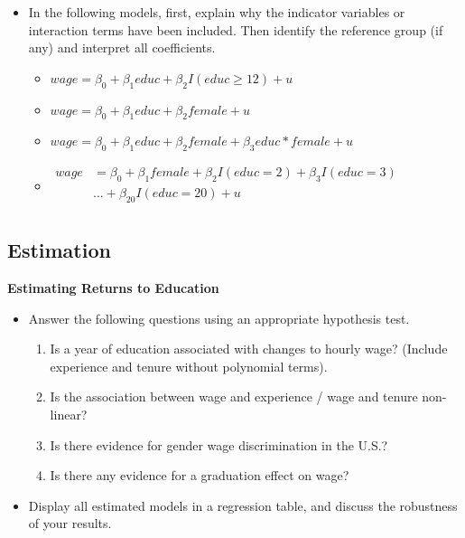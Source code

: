 \documentclass[
]{book}
\providecommand{\tightlist}{%
  \setlength{\itemsep}{0pt}\setlength{\parskip}{0pt}}
\theoremstyle{definition}
\theoremstyle{definition}
\theoremstyle{definition}
\theoremstyle{definition}
\theoremstyle{remark}
\begin{document}
\begin{itemize}
\item
  In the following models, first, explain why the indicator variables or interaction terms have been included. Then identify the reference group (if any) and interpret all coefficients.

  \begin{itemize}
  \item
    \(wage = \beta_0 + \beta_1 educ + \beta_2 I(educ \geq 12) + u\)
  \item
    \(wage = \beta_0 + \beta_1 educ + \beta_2 female + u\)
  \item
    \(wage = \beta_0 + \beta_1 educ + \beta_2 female + \beta_3 educ*female + u\)
  \item
    \(\begin{aligned} wage &= \beta_0 + \beta_1 female + \beta_2 I(educ = 2) + \beta_3 I(educ = 3)\\ &...+ \beta_{20} I(educ = 20) + u\\ \end{aligned}\)
  \end{itemize}
\end{itemize}

\hypertarget{estimation}{%
\subsection{Estimation}\label{estimation}}

\textbf{Estimating Returns to Education}

\begin{itemize}
\tightlist
\item
  Answer the following questions using an appropriate hypothesis test.

  \begin{enumerate}
  \def\labelenumi{\arabic{enumi}.}
  \tightlist
  \item
    Is a year of education associated with changes to hourly wage? (Include experience and tenure without polynomial terms).
  \item
    Is the association between wage and experience / wage and tenure non-linear?
  \item
    Is there evidence for gender wage discrimination in the U.S.?
  \item
    Is there any evidence for a graduation effect on wage?
  \end{enumerate}
\item
  Display all estimated models in a regression table, and discuss the robustness of your results.
\end{itemize}
\end{document}
